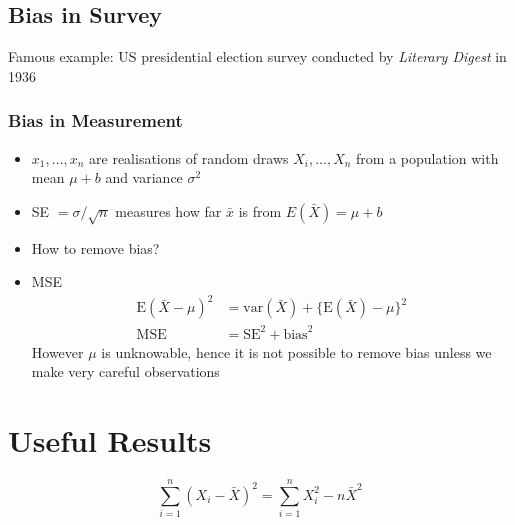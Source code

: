 \documentclass{article}
\begin{document}
\begin{multicols}{2}
\subsection{Bias in Survey}
Famous example: US presidential election survey conducted by \textit{Literary Digest} in 1936
\subsubsection{Bias in Measurement}
\begin{itemize}
	\item $x_1, \dots, x_n$ are realisations of random draws $X_i, \dots, X_n$ from a population with mean $\mu + b$ and variance $\sigma^2$
	\item SE $= \sigma/\sqrt{n}$ measures how far $\bar{x}$ is from $E(\bar{X}) = \mu + b$
	\item How to remove bias?
	\item MSE
	\begin{equation*}
		\begin{aligned}
			\text{E}(\bar{X}-\mu)^2 &= \text{var}(\bar{X}) + \{\text{E}(\bar{X}) - \mu\}^2\\
			\text{MSE} &= \text{SE}^2 + \text{bias}^2
		\end{aligned}
	\end{equation*}
However $\mu$ is unknowable, hence it is not possible to remove bias unless we make very careful observations
\end{itemize}

\section{Useful Results}
$$\sum_{i=1}^n(X_i-\bar{X})^2 = \sum_{i=1}^nX_i^2 - n\bar{X}^2$$
\end{multicols}
\end{document}
